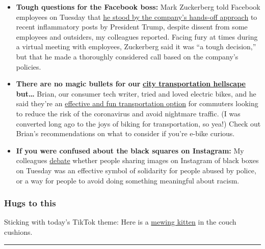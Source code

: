 \begin{itemize}
\item
  \textbf{Tough questions for the Facebook boss:} Mark Zuckerberg told
  Facebook employees on Tuesday that
  \href{https://www.nytimes.com/2020/06/02/technology/zuckerberg-defends-facebook-trump-posts.html}{he
  stood by the company's hands-off approach} to recent inflammatory
  posts by President Trump, despite dissent from some employees and
  outsiders, my colleagues reported. Facing fury at times during a
  virtual meeting with employees, Zuckerberg said it was ``a tough
  decision,'' but that he made a thoroughly considered call based on the
  company's policies.
\item
  \textbf{There are no magic bullets for our}
  \textbf{\href{https://www.nytimes.com/2020/05/27/technology/public-transportation-cities-pandemic.html}{city
  transportation hellscape}} \textbf{but\ldots{}} Brian, our consumer
  tech writer, tried and loved electric bikes, and he said they're an
  \href{https://www.nytimes.com/2020/06/03/technology/personaltech/e-bikes-are-having-their-moment-they-deserve-it.html}{effective
  and fun transportation option} for commuters looking to reduce the
  risk of the coronavirus and avoid nightmare traffic. (I was converted
  long ago to the joys of biking for transportation, so yea!) Check out
  Brian's recommendations on what to consider if you're e-bike curious.
\item
  \textbf{If you were confused about the black squares on Instagram:} My
  colleagues
  \href{https://www.nytimes.com/2020/06/02/style/instagram-blackout.html}{debate}
  whether people sharing images on Instagram of black boxes on Tuesday
  was an effective symbol of solidarity for people abused by police, or
  a way for people to avoid doing something meaningful about racism.
\end{itemize}

\hypertarget{hugs-to-this}{%
\subsubsection{Hugs to this}\label{hugs-to-this}}

Sticking with today's TikTok theme: Here is a
\href{https://www.tiktok.com/@miaamabile/video/6807566845948873990}{mewing
kitten} in the couch cushions.

\begin{center}\rule{0.5\linewidth}{\linethickness}\end{center}

